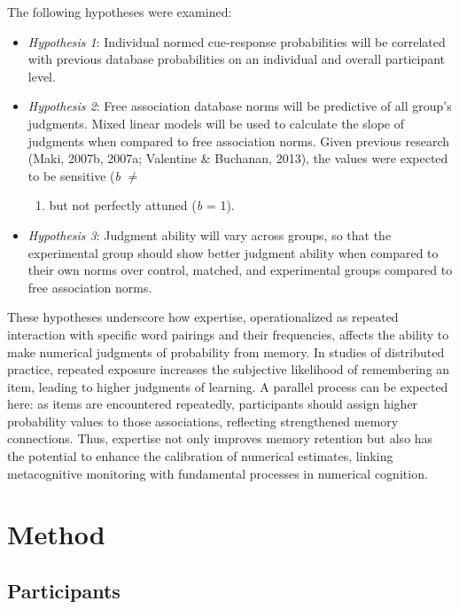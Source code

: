 \documentclass[
  man,floatsintext]{apa7}
\providecommand{\tightlist}{%
  \setlength{\itemsep}{0pt}\setlength{\parskip}{0pt}}
\begin{document}
The following hypotheses were examined:

\begin{itemize}
\tightlist
\item
  \emph{Hypothesis 1}: Individual normed cue-response probabilities will be
  correlated with previous database probabilities on an individual and
  overall participant level.
\item
  \emph{Hypothesis 2}: Free association database norms will be predictive
  of all group's judgments. Mixed linear models will be used to
  calculate the slope of judgments when compared to free association
  norms. Given previous research (Maki, 2007b, 2007a; Valentine \& Buchanan, 2013), the values were expected to be sensitive (\emph{b} \(\ne\)

  \begin{enumerate}
  \def\labelenumi{\arabic{enumi})}
  \setcounter{enumi}{-1}
  \tightlist
  \item
    but not perfectly attuned (\emph{b} = 1).
  \end{enumerate}
\item
  \emph{Hypothesis 3}: Judgment ability will vary across groups, so that
  the experimental group should show better judgment ability when
  compared to their own norms over control, matched, and experimental
  groups compared to free association norms.
\end{itemize}

These hypotheses underscore how expertise, operationalized as repeated
interaction with specific word pairings and their frequencies, affects
the ability to make numerical judgments of probability from memory. In
studies of distributed practice, repeated exposure increases the
subjective likelihood of remembering an item, leading to higher
judgments of learning. A parallel process can be expected here: as items
are encountered repeatedly, participants should assign higher
probability values to those associations, reflecting strengthened memory
connections. Thus, expertise not only improves memory retention but also
has the potential to enhance the calibration of numerical estimates,
linking metacognitive monitoring with fundamental processes in numerical
cognition.

\section{Method}\label{method}

\subsection{Participants}\label{participants}
\end{document}
